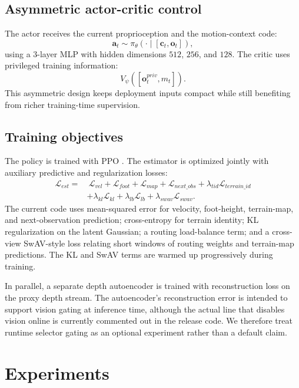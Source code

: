 \documentclass[letterpaper,10pt,conference]{ieeeconf}
\begin{document}
\subsection{Asymmetric actor-critic control}
The actor receives the current proprioception and the motion-context code:
\begin{equation}
\mathbf{a}_t \sim \pi_{\theta}(\cdot \mid [\mathbf{c}_t, \mathbf{o}_t]),
\end{equation}
using a 3-layer MLP with hidden dimensions $512$, $256$, and $128$. The critic uses privileged training information:
\begin{equation}
V_{\psi}([\mathbf{o}^{priv}_t, m_t]).
\end{equation}
This asymmetric design keeps deployment inputs compact while still benefiting from richer training-time supervision.

\subsection{Training objectives}
The policy is trained with PPO \cite{schulman2017ppo}. The estimator is optimized jointly with auxiliary predictive and regularization losses:
\begin{align}
\mathcal{L}_{est} = &\ \mathcal{L}_{vel}
+ \mathcal{L}_{foot}
+ \mathcal{L}_{map}
+ \mathcal{L}_{next\_obs}
+ \lambda_{tid}\mathcal{L}_{terrain\_id} \nonumber \\
&+ \lambda_{kl}\mathcal{L}_{kl}
+ \lambda_{lb}\mathcal{L}_{lb}
+ \lambda_{swav}\mathcal{L}_{swav}.
\end{align}
The current code uses mean-squared error for velocity, foot-height, terrain-map, and next-observation prediction; cross-entropy for terrain identity; KL regularization on the latent Gaussian; a routing load-balance term; and a cross-view SwAV-style loss relating short windows of routing weights and terrain-map predictions. The KL and SwAV terms are warmed up progressively during training.

In parallel, a separate depth autoencoder is trained with reconstruction loss on the proxy depth stream. The autoencoder's reconstruction error is intended to support vision gating at inference time, although the actual line that disables vision online is currently commented out in the release code. We therefore treat runtime selector gating as an optional experiment rather than a default claim.

\section{Experiments}
\end{document}
